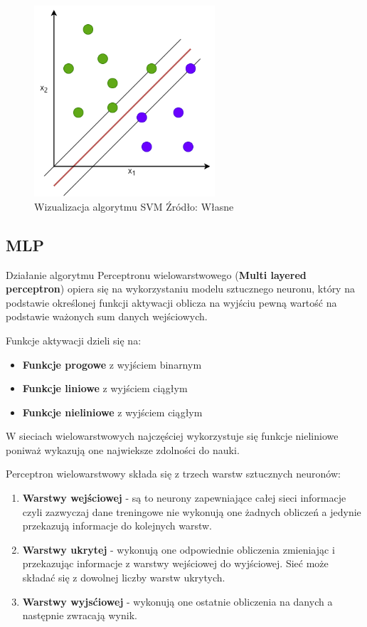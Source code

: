 \begin{figure}[h]
    \centering
    \includegraphics[width=0.6\textwidth]{./Img/SVM.png}
    \caption{Wizualizacja algorytmu SVM Źródło: Własne}
\end{figure}

\subsection{MLP}

Działanie algorytmu Perceptronu wielowarstwowego (\textbf{Multi layered perceptron}) 
opiera się na wykorzystaniu modelu sztucznego neuronu, który na podstawie określonej
funkcji aktywacji oblicza na wyjściu pewną wartość na podstawie ważonych sum danych
wejściowych. 

Funkcje aktywacji dzieli się na:
\begin{itemize}
    \item \textbf{Funkcje progowe} z wyjściem binarnym
    \item \textbf{Funkcje liniowe} z wyjściem ciągłym
    \item \textbf{Funkcje nieliniowe} z wyjściem ciągłym
\end{itemize}
W sieciach wielowarstwowych najczęściej wykorzystuje się funkcje nieliniowe poniważ 
wykazują one najwieksze zdolności do nauki.

Perceptron wielowarstwowy składa się z trzech warstw sztucznych neuronów: 
\begin{enumerate}
    \item \textbf{Warstwy wejściowej} - są to neurony zapewniające całej sieci
    informacje czyli zazwyczaj dane treningowe nie wykonują one żadnych obliczeń
    a jedynie przekazują informacje do kolejnych warstw.
    \item \textbf{Warstwy ukrytej} - wykonują one odpowiednie obliczenia zmieniając 
    i przekazując informacje z warstwy wejściowej do wyjściowej. Sieć może składać
    się z dowolnej liczby warstw ukrytych.
    \item \textbf{Warstwy wyjsćiowej} - wykonują one ostatnie obliczenia na danych 
    a następnie zwracają wynik.
\end{enumerate}

